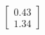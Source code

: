 \documentclass[preview]{standalone}
\begin{document}
\begin{align*}
\begin{bmatrix} 0.43 \\ 1.34 \end{bmatrix}
\end{align*}
\end{document}
